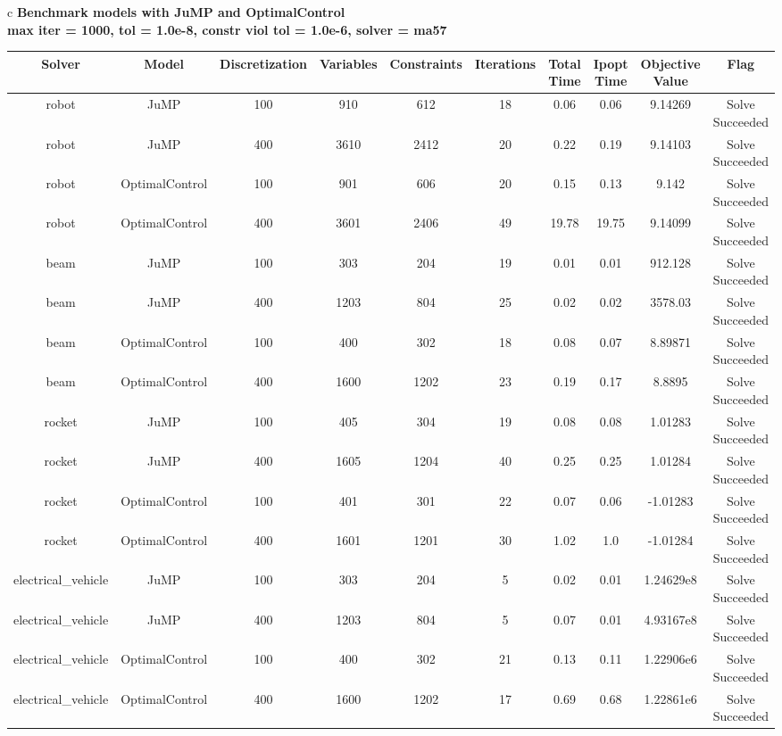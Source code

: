 \documentclass{standalone}
\begin{document}
\begin{tabular}{c}
\Large\textbf{Benchmark models with JuMP and OptimalControl}\\
\large\textbf{max iter = 1000, tol = 1.0e-8, constr viol tol = 1.0e-6, solver = ma57}\\
\begin{tabular}{cccccccccc}
  \hline
  \textbf{Solver} & \textbf{Model} & \textbf{Discretization} & \textbf{Variables} & \textbf{Constraints} & \textbf{Iterations} & \textbf{Total Time} & \textbf{Ipopt Time} & \textbf{Objective Value} & \textbf{Flag} \\\hline
  robot & JuMP & 100 & 910 & 612 & 18 & 0.06 & 0.06 & 9.14269 & Solve Succeeded \\
  robot & JuMP & 400 & 3610 & 2412 & 20 & 0.22 & 0.19 & 9.14103 & Solve Succeeded \\
  robot & OptimalControl & 100 & 901 & 606 & 20 & 0.15 & 0.13 & 9.142 & Solve Succeeded \\
  robot & OptimalControl & 400 & 3601 & 2406 & 49 & 19.78 & 19.75 & 9.14099 & Solve Succeeded \\
  beam & JuMP & 100 & 303 & 204 & 19 & 0.01 & 0.01 & 912.128 & Solve Succeeded \\
  beam & JuMP & 400 & 1203 & 804 & 25 & 0.02 & 0.02 & 3578.03 & Solve Succeeded \\
  beam & OptimalControl & 100 & 400 & 302 & 18 & 0.08 & 0.07 & 8.89871 & Solve Succeeded \\
  beam & OptimalControl & 400 & 1600 & 1202 & 23 & 0.19 & 0.17 & 8.8895 & Solve Succeeded \\
  rocket & JuMP & 100 & 405 & 304 & 19 & 0.08 & 0.08 & 1.01283 & Solve Succeeded \\
  rocket & JuMP & 400 & 1605 & 1204 & 40 & 0.25 & 0.25 & 1.01284 & Solve Succeeded \\
  rocket & OptimalControl & 100 & 401 & 301 & 22 & 0.07 & 0.06 & -1.01283 & Solve Succeeded \\
  rocket & OptimalControl & 400 & 1601 & 1201 & 30 & 1.02 & 1.0 & -1.01284 & Solve Succeeded \\
  electrical\_vehicle & JuMP & 100 & 303 & 204 & 5 & 0.02 & 0.01 & 1.24629e8 & Solve Succeeded \\
  electrical\_vehicle & JuMP & 400 & 1203 & 804 & 5 & 0.07 & 0.01 & 4.93167e8 & Solve Succeeded \\
  electrical\_vehicle & OptimalControl & 100 & 400 & 302 & 21 & 0.13 & 0.11 & 1.22906e6 & Solve Succeeded \\
  electrical\_vehicle & OptimalControl & 400 & 1600 & 1202 & 17 & 0.69 & 0.68 & 1.22861e6 & Solve Succeeded \\\hline
\end{tabular}
\end{tabular}
\end{document}
